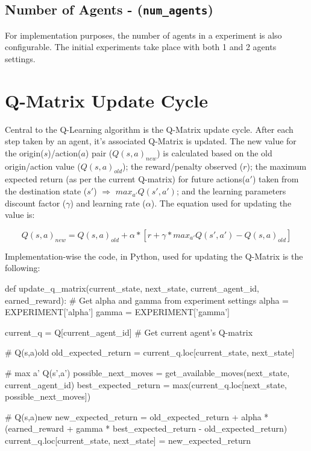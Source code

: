 \documentclass[11pt]{article}
\begin{document}
    \subsection{Number of Agents - (\texttt{num\_agents})}
        For implementation purposes, the number of agents in a experiment is also configurable. The initial experiments take place with both 1 and 2 agents settings.

\section{Q-Matrix Update Cycle}
    Central to the Q-Learning algorithm is the Q-Matrix update cycle. After each step taken by an agent, it's associated Q-Matrix is updated. The new value for the origin($s$)/action($a$) pair ($Q(s,a)_{new}$) is calculated based on the old origin/action value ($Q(s,a)_{old}$); the reward/penalty observed ($r$); the maximum expected return (as per the current Q-matrix) for future actions($a'$) taken from the destination state ($s'$) $\Rightarrow$ $max_{a'} Q(s',a')$; and the learning parameters discount factor ($\gamma$) and learning rate ($\alpha$). The equation used for updating the value is:

    \begin{equation}
        Q(s,a)_{new} = Q(s,a)_{old} + \alpha*[r+\gamma*max_{a'} Q(s',a') - Q(s,a)_{old}]
    \end{equation}

    Implementation-wise the code, in Python, used for updating the Q-Matrix is the following:

    \begin{python}
def update_q_matrix(current_state, next_state, current_agent_id, earned_reward):
    # Get alpha and gamma from experiment settings
    alpha = EXPERIMENT['alpha']
    gamma = EXPERIMENT['gamma']


    current_q = Q[current_agent_id] # Get current agent's Q-matrix

    # Q(s,a)old
    old_expected_return = current_q.loc[current_state, next_state]

    # max a' Q(s',a')
    possible_next_moves = get_available_moves(next_state, current_agent_id)
    best_expected_return = max(current_q.loc[next_state, possible_next_moves])

    # Q(s,a)new
    new_expected_return = old_expected_return + alpha * (earned_reward + gamma * best_expected_return - old_expected_return)
    current_q.loc[current_state, next_state] = new_expected_return
    \end{python}
\end{document}
